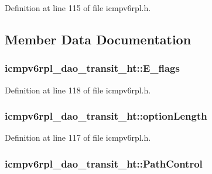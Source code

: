 Definition at line 115 of file icmpv6rpl.\+h.



\subsection{Member Data Documentation}
\subsubsection[{\texorpdfstring{E\+\_\+flags}{E_flags}}]{ icmpv6rpl\+\_\+dao\+\_\+transit\+\_\+ht\+::\+E\+\_\+flags}\hypertarget{structicmpv6rpl__dao__transit__ht_a8d171440870fd3c2046746f796f66cde}{}\label{structicmpv6rpl__dao__transit__ht_a8d171440870fd3c2046746f796f66cde}


Definition at line 118 of file icmpv6rpl.\+h.

\subsubsection[{\texorpdfstring{option\+Length}{optionLength}}]{ icmpv6rpl\+\_\+dao\+\_\+transit\+\_\+ht\+::option\+Length}\hypertarget{structicmpv6rpl__dao__transit__ht_a4ce1e12d4aee1a20a166b70fbd83d1f0}{}\label{structicmpv6rpl__dao__transit__ht_a4ce1e12d4aee1a20a166b70fbd83d1f0}


Definition at line 117 of file icmpv6rpl.\+h.

\subsubsection[{\texorpdfstring{Path\+Control}{PathControl}}]{ icmpv6rpl\+\_\+dao\+\_\+transit\+\_\+ht\+::\+Path\+Control}\hypertarget{structicmpv6rpl__dao__transit__ht_a4570d3d6ae34cce8d05a4f1da1521696}{}\label{structicmpv6rpl__dao__transit__ht_a4570d3d6ae34cce8d05a4f1da1521696}


